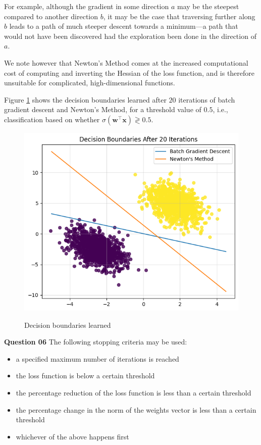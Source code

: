 \documentclass{article}[a4paper]
\begin{document}
	For example, although the gradient in some direction $a$ may be the steepest compared to another direction $b$, it may be the case that traversing further along $b$ leads to a path of much steeper descent towards a minimum---a path that would not have been discovered had the exploration been done in the direction of $a$.

	We note however that Newton's Method comes at the increased computational cost of computing and inverting the Hessian of the loss function, and is therefore unsuitable for complicated, high-dimensional functions.

	Figure \ref{q3_5_2} shows the decision boundaries learned after $20$ iterations of batch gradient descent and Newton's Method, for a threshold value of $0.5$, i.e., classification based on whether $\sigma\left( \mathbf{w}^\top \mathbf{x} \right) \gtrless 0.5$.
	
	\begin{figure}[H]
		\centering
		\includegraphics[width=0.8\linewidth]{images/q3_5_2.png}
		\label{q3_5_2}
		\caption{Decision boundaries learned}
	\end{figure}
	
	\textbf{Question 06} The following stopping criteria may be used:
	\begin{itemize}[noitemsep]
		\item a specified maximum number of iterations is reached
		\item the loss function is below a certain threshold
		\item the percentage reduction of the loss function is less than a certain threshold
		\item the percentage change in the norm of the weights vector is less than a certain threshold
		\item whichever of the above happens first
	\end{itemize}
	\medskip
\end{document}
